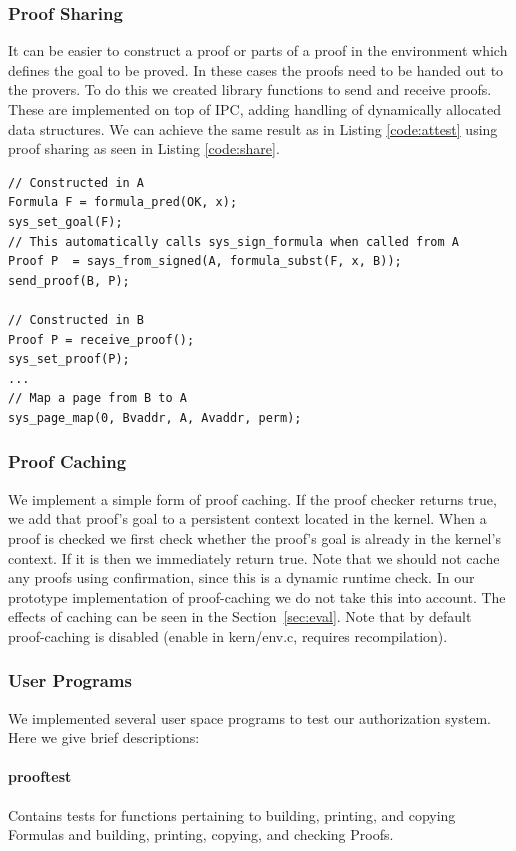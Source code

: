 \documentclass[10pt]{article}
\begin{document}
\subsubsection{Proof Sharing}\label{sec:share}
It can be easier to construct a proof or parts of a proof in the environment which defines the goal to be proved.  In these cases the proofs need to be handed out to the provers.  To do this we created library functions to send and receive proofs.  These are implemented on top of IPC, adding handling of dynamically allocated data structures.  We can achieve the same result as in Listing \ref{code:attest} using proof sharing as seen in Listing \ref{code:share}.
\begin{lstlisting}
// Constructed in A
Formula F = formula_pred(OK, x);
sys_set_goal(F);
// This automatically calls sys_sign_formula when called from A
Proof P  = says_from_signed(A, formula_subst(F, x, B));
send_proof(B, P);

// Constructed in B
Proof P = receive_proof();
sys_set_proof(P);
...
// Map a page from B to A
sys_page_map(0, Bvaddr, A, Avaddr, perm);
\end{lstlisting}

\subsubsection{Proof Caching}\label{sec:cache}
We implement a simple form of proof caching.  If the proof checker returns true, we add that proof's goal to a persistent context located in the kernel.  When a proof is checked we first check whether the proof's goal is already in the kernel's context.  If it is then we immediately return true.  Note that we should not cache any proofs using confirmation, since this is a dynamic runtime check.  In our prototype implementation of proof-caching we do not take this into account. The effects of caching can be seen in the Section~\ref{sec:eval}. Note that by default proof-caching is disabled (enable in \textsf{kern/env.c}, requires recompilation).

\subsubsection{User Programs}
We implemented several user space programs to test our authorization system. Here we give brief descriptions:

\paragraph{prooftest} Contains tests for functions pertaining to building, printing, and copying Formulas and building, printing, copying, and checking Proofs.
\end{document}
